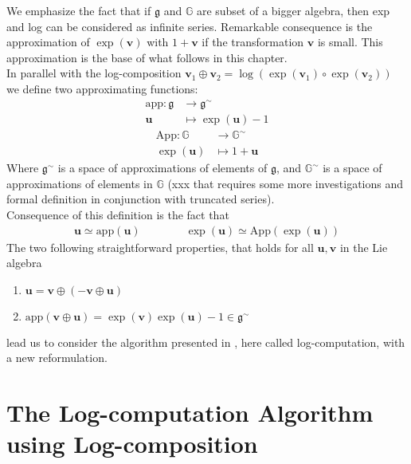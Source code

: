 \noindent
We emphasize the fact that if $\mathfrak{g}$ and $\mathbb{G}$ are subset of a bigger algebra, then exp and log can be considered as infinite series.
Remarkable consequence is the approximation of $\exp(\mathbf{v})$ with $1 + \mathbf{v}$ if the transformation $\mathbf{v}$ is small. This approximation is the base of what follows in this chapter.\\
In parallel with the log-composition $ \mathbf{v}_{1}\oplus \mathbf{v}_{2} =  \log(\exp(\mathbf{v}_1)\circ \exp(\mathbf{v}_2))$ 
we define two approximating functions:
\begin{align*}
\text{app} : \mathfrak{g} & \longrightarrow  \mathfrak{g} ^{\sim}    \\
\mathbf{u} &\longmapsto \exp(\mathbf{u}) - 1
\end{align*}
\begin{align*}
\text{App} : \mathbb{G} & \longrightarrow  \mathbb{G}^{\sim}   \\
\exp(\mathbf{u}) &\longmapsto 1 + \mathbf{u}
\end{align*}
Where $\mathfrak{g} ^{\sim}$ is a space of approximations of elements of $\mathfrak{g} $, and $\mathbb{G}^{\sim} $ is a space of approximations of elements in $\mathbb{G}$ (xxx that requires some more investigations and formal definition in conjunction with truncated series).\\
Consequence of this definition is the fact that
\begin{align*}
\mathbf{u} \simeq   \text{app} (\mathbf{u})
\qquad \qquad 
\exp(\mathbf{u}) \simeq   \text{App} (\exp(\mathbf{u})) 
\end{align*}
The two following straightforward properties, that holds for all $\mathbf{u}, \mathbf{v} $ in the Lie algebra
\begin{enumerate}
	\item $\mathbf{u} = \mathbf{v} \oplus (-\mathbf{v} \oplus  \mathbf{u} )$
	\item $\text{app} (\mathbf{v} \oplus  \mathbf{u}) = \exp(\mathbf{v})\exp(\mathbf{u}) - 1 \in \mathfrak{g} ^{\sim}$
\end{enumerate}
lead us to consider the algorithm presented in \cite{Bossa:08}, here called log-computation, with a new reformulation. 

\section{The Log-computation Algorithm using Log-composition}

